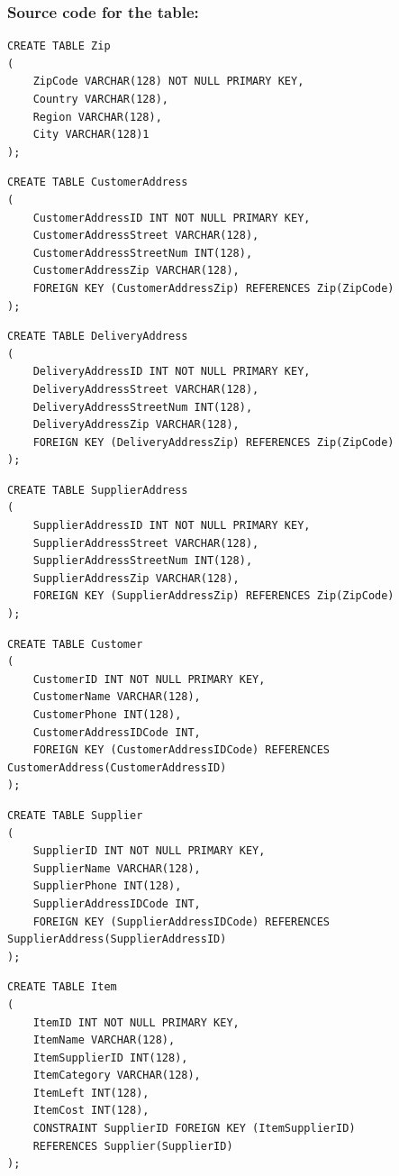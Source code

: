 \documentclass[11pt]{article}
\begin{document}
\subsubsection{Source code for the table:}
\label{sec:org62efe78}
\begin{center}
\begin{verbatim}
CREATE TABLE Zip
(
    ZipCode VARCHAR(128) NOT NULL PRIMARY KEY,
    Country VARCHAR(128),
    Region VARCHAR(128),
    City VARCHAR(128)1
);
\end{verbatim}
\begin{verbatim}
CREATE TABLE CustomerAddress
(
    CustomerAddressID INT NOT NULL PRIMARY KEY,
    CustomerAddressStreet VARCHAR(128),
    CustomerAddressStreetNum INT(128),
    CustomerAddressZip VARCHAR(128),
    FOREIGN KEY (CustomerAddressZip) REFERENCES Zip(ZipCode)
);

\end{verbatim}
\begin{verbatim}
CREATE TABLE DeliveryAddress
(
    DeliveryAddressID INT NOT NULL PRIMARY KEY,
    DeliveryAddressStreet VARCHAR(128),
    DeliveryAddressStreetNum INT(128),
    DeliveryAddressZip VARCHAR(128),
    FOREIGN KEY (DeliveryAddressZip) REFERENCES Zip(ZipCode)
);

\end{verbatim}
\begin{verbatim}
CREATE TABLE SupplierAddress
(
    SupplierAddressID INT NOT NULL PRIMARY KEY,
    SupplierAddressStreet VARCHAR(128),
    SupplierAddressStreetNum INT(128),
    SupplierAddressZip VARCHAR(128),
    FOREIGN KEY (SupplierAddressZip) REFERENCES Zip(ZipCode)
);

\end{verbatim}
\begin{verbatim}
CREATE TABLE Customer
(
    CustomerID INT NOT NULL PRIMARY KEY,
    CustomerName VARCHAR(128),
    CustomerPhone INT(128),
    CustomerAddressIDCode INT,
    FOREIGN KEY (CustomerAddressIDCode) REFERENCES CustomerAddress(CustomerAddressID)
);

\end{verbatim}
\begin{verbatim}
CREATE TABLE Supplier
(
    SupplierID INT NOT NULL PRIMARY KEY,
    SupplierName VARCHAR(128),
    SupplierPhone INT(128),
    SupplierAddressIDCode INT,
    FOREIGN KEY (SupplierAddressIDCode) REFERENCES SupplierAddress(SupplierAddressID)
);

\end{verbatim}
\begin{verbatim}
CREATE TABLE Item
(
    ItemID INT NOT NULL PRIMARY KEY,
    ItemName VARCHAR(128),
    ItemSupplierID INT(128),
    ItemCategory VARCHAR(128),
    ItemLeft INT(128),
    ItemCost INT(128),
    CONSTRAINT SupplierID FOREIGN KEY (ItemSupplierID)
    REFERENCES Supplier(SupplierID)
);


\end{verbatim}
\end{center}
\end{document}
